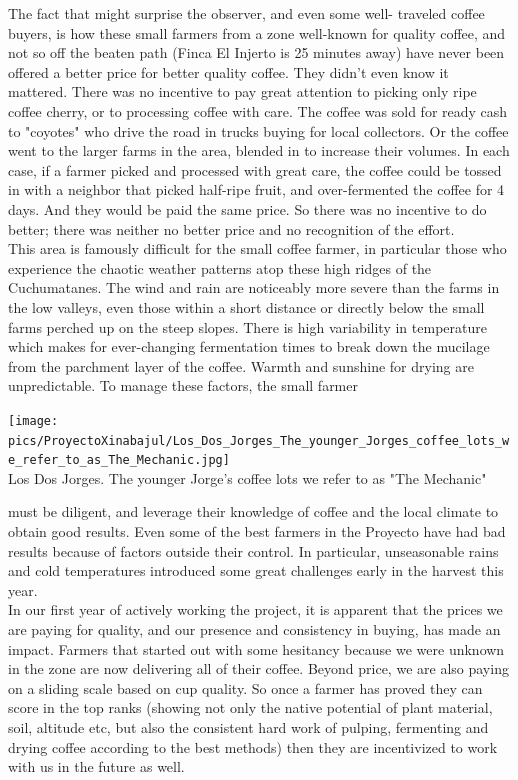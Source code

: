 \documentclass[10pt,twoside,footinclude=true,headinclude=true]{scrbook} %
\begin{document}
\medskip
The fact that might surprise the observer, and even some well- traveled coffee buyers, is how these small farmers from a zone well-known for quality coffee, and not so off the beaten path (Finca El Injerto is 25 minutes away) have never been offered a better price for better quality coffee. They didn't even know it mattered. There was no incentive to pay great attention to picking only ripe coffee cherry, or to processing coffee with care. The coffee was sold for ready cash to "coyotes" who drive the road in trucks buying for local collectors. Or the coffee went to the larger farms in the area, blended in to increase their volumes. In each case, if a farmer picked and processed with great care, the coffee could be tossed in with a neighbor that picked half-ripe fruit, and over-fermented the coffee for 4 days. And they would be paid the same price. So there was no incentive to do better; there was neither no better price and no recognition of the effort.\\
\medskip
This area is famously difficult for the small coffee farmer, in particular those who experience the chaotic weather patterns atop these high ridges of the Cuchumatanes. The wind and rain are noticeably more severe than the farms in the low valleys, even those within a short distance or directly below the small farms perched up on the steep slopes. There is high variability in temperature which makes for ever-changing fermentation times to break down the mucilage from the parchment layer of the coffee. Warmth and sunshine for drying are unpredictable. To manage these factors, the small farmer\\
\begin{center}
	\texttt{[image: pics/ProyectoXinabajul/Los\_Dos\_Jorges\_The\_younger\_Jorges\_coffee\_lots\_we\_refer\_to\_as\_The\_Mechanic.jpg]} \\
	\scriptsize
	Los Dos Jorges. The younger Jorge's coffee lots we refer to as "The Mechanic"
\end{center}
must be diligent, and leverage their knowledge of coffee and the local climate to obtain good results. Even some of the best farmers
in the Proyecto have had bad results because of factors outside their control. In particular, unseasonable rains and cold temperatures introduced some great challenges early in the harvest this year.\\
\medskip
In our first year of actively working the project, it is apparent that the prices we are paying for quality, and our presence and consistency in buying, has made an impact. Farmers that started out with some hesitancy because we were unknown in the zone are now delivering all of their coffee. Beyond price, we are also paying on a sliding scale based on cup quality. So once a farmer has proved they can score in the top ranks (showing not only the native potential of plant material, soil, altitude etc, but also the consistent hard work of pulping, fermenting and drying coffee according to the best methods) then they are incentivized to work with us in the future as well.\\
\end{document}

